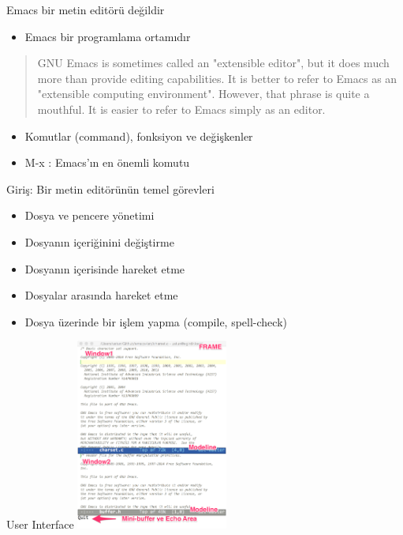\documentclass[presentation]{beamer}
\begin{document}
\begin{frame}[label=sec-3]{Emacs bir metin editörü değildir}
\begin{itemize}
\item Emacs bir programlama ortamıdır
\end{itemize}
\begin{quote}
GNU Emacs is sometimes called an "extensible editor", but it does
much more than provide editing capabilities.  It is better to refer to
Emacs as an "extensible computing environment".  However, that phrase
is quite a mouthful.  It is easier to refer to Emacs simply as an
editor.
\end{quote}

\begin{itemize}
\item Komutlar (command), fonksiyon ve değişkenler
\item M-x : Emacs'ın en önemli komutu
\end{itemize}
\end{frame}

\begin{frame}[label=sec-4]{Giriş: Bir metin editörünün temel görevleri}
\begin{itemize}
\item Dosya ve pencere yönetimi
\item Dosyanın içeriğinini değiştirme
\item Dosyanın içerisinde hareket etme
\item Dosyalar arasında hareket etme
\item Dosya üzerinde bir işlem yapma (compile, spell-check)
\end{itemize}
\end{frame}

\begin{frame}[label=sec-5]{User Interface}
\includegraphics[width=5cm]{./images/emacs.png}
\end{frame}
\end{document}
